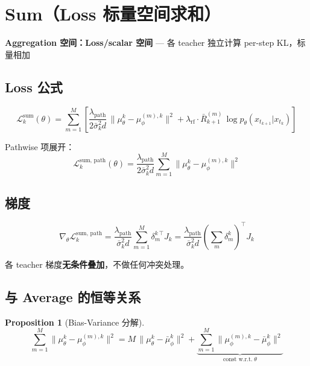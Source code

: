 \documentclass[11pt,a4paper]{article}
\newcommand{\loss}{\mathcal{L}}
\newcommand{\mutheta}{\mu_\theta}
\newcommand{\muphi}{\mu_\phi}
\newcommand{\mubar}{\bar{\mu}_\phi}
\newcommand{\sigbar}{\bar{\sigma}}
\newcommand{\Rbar}{\bar{R}}
\newcommand{\lpath}{\lambda_{\mathrm{path}}}
\newcommand{\lrf}{\lambda_{\mathrm{rf}}}
\theoremstyle{definition}
\newtheorem{proposition}{Proposition}
\begin{document}
\section{Sum（Loss 标量空间求和）}
\label{sec:sum}

\begin{tcolorbox}[colback=orange!5, colframe=orange!50]
\textbf{Aggregation 空间：Loss/scalar 空间} — 各 teacher 独立计算 per-step KL，标量相加
\end{tcolorbox}

\subsection{Loss 公式}

\begin{equation}
\boxed{
\loss_k^{\mathrm{sum}}(\theta) = \sum_{m=1}^M \left[
\frac{\lpath}{2\sigbar_k^2 d}\,\|\mutheta^k - \muphi^{(m),k}\|^2
+ \lrf \cdot \Rbar_{k+1}^{(m)}\,\log p_\theta(x_{t_{k+1}}|x_{t_k})
\right]
}
\label{eq:loss_sum}
\end{equation}

Pathwise 项展开：
\begin{equation}
\loss_k^{\mathrm{sum,\,path}}(\theta) = \frac{\lpath}{2\sigbar_k^2 d}\sum_{m=1}^M \|\mutheta^k - \muphi^{(m),k}\|^2
\label{eq:loss_sum_path}
\end{equation}

\subsection{梯度}

\begin{equation}
\nabla_\theta \loss_k^{\mathrm{sum,\,path}} = \frac{\lpath}{\sigbar_k^2 d}\sum_{m=1}^M \delta_m^{k\,\top} J_k
= \frac{\lpath}{\sigbar_k^2 d}\left(\sum_m \delta_m^k\right)^\top J_k
\end{equation}

各 teacher 梯度\textbf{无条件叠加}，不做任何冲突处理。

\subsection{与 Average 的恒等关系}

\begin{proposition}[Bias-Variance 分解]
\begin{equation}
\sum_{m=1}^M \|\mutheta^k - \muphi^{(m),k}\|^2
= M\,\|\mutheta^k - \mubar^k\|^2 + \underbrace{\sum_{m=1}^M \|\muphi^{(m),k} - \mubar^k\|^2}_{\text{const w.r.t.}\;\theta}
\label{eq:bias_variance}
\end{equation}
\end{proposition}
\end{document}
